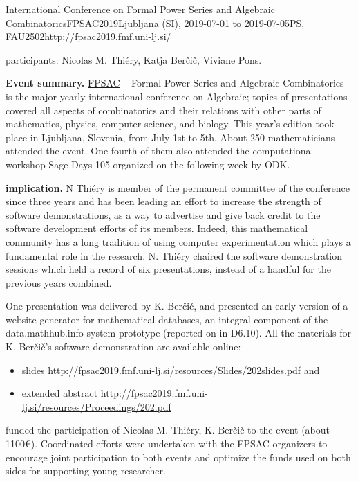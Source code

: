 \begin{event}{International Conference on Formal Power Series and Algebraic Combinatorics}{FPSAC2019}{Ljubljana (SI),
  2019-07-01 to
  2019-07-05}{PS, FAU}{250}{2}{http://fpsac2019.fmf.uni-lj.si/}

\ODK participants: Nicolas M. Thi\'ery, Katja Ber\v{c}i\v{c}, Viviane
Pons.

\textbf{Event summary.} \href{http://fpsac.org}{FPSAC} -- Formal Power
Series and Algebraic Combinatorics -- is the major yearly
international conference on Algebraic; topics of presentations covered
all aspects of combinatorics and their relations with other parts of
mathematics, physics, computer science, and biology. This year's
edition took place in Ljubljana, Slovenia, from July 1st to 5th. About
250 mathematicians attended the event. One fourth of them also
attended the computational workshop Sage Days 105 organized on the
following week by ODK.

\textbf{\ODK implication.} N Thiéry is member of the permanent
committee of the conference since three years and has been leading an
effort to increase the strength of software demonstrations, as a way
to advertise and give back credit to the software development efforts
of its members. Indeed, this mathematical community has a long
tradition of using computer experimentation which plays a fundamental
role in the research. N. Thiéry chaired the software demonstration
sessions which held a record of six presentations, instead of a
handful for the previous years combined.

One presentation was delivered by K. Ber\v{c}i\v{c}, and presented an
early version of a website generator for mathematical databases, an
integral component of the \textsf{data.math\-hub.info} system
prototype (reported on in D6.10). All the materials for K.
Ber\v{c}i\v{c}'s software demonstration are available online:
\begin{itemize}
\item slides \url{http://fpsac2019.fmf.uni-lj.si/resources/Slides/202slides.pdf} and
\item extended abstract \url{http://fpsac2019.fmf.uni-lj.si/resources/Proceedings/202.pdf}
\end{itemize}

\ODK funded the participation of Nicolas M. Thiéry, K. Ber\v{c}i\v{c}
to the event (about 1100\euro). Coordinated efforts were undertaken
with the FPSAC organizers to encourage joint participation to both
events and optimize the funds used on both sides for supporting young
researcher.


\end{event}
